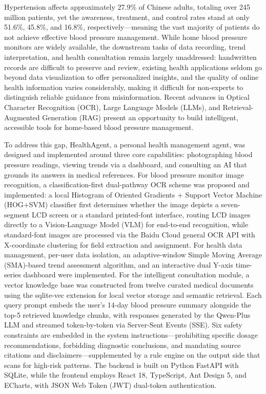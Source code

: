 \documentclass[zihao=-4,a4paper]{ctexart}
\begin{document}
{
Hypertension affects approximately 27.9\% of Chinese adults, totaling over 245 million patients, yet the awareness, treatment, and control rates stand at only 51.6\%, 45.8\%, and 16.8\%, respectively—meaning the vast majority of patients do not achieve effective blood pressure management. While home blood pressure monitors are widely available, the downstream tasks of data recording, trend interpretation, and health consultation remain largely unaddressed: handwritten records are difficult to preserve and review, existing health applications seldom go beyond data visualization to offer personalized insights, and the quality of online health information varies considerably, making it difficult for non-experts to distinguish reliable guidance from misinformation. Recent advances in Optical Character Recognition (OCR), Large Language Models (LLMs), and Retrieval-Augmented Generation (RAG) present an opportunity to build intelligent, accessible tools for home-based blood pressure management.

To address this gap, HealthAgent, a personal health management agent, was designed and implemented around three core capabilities: photographing blood pressure readings, viewing trends via a dashboard, and consulting an AI that grounds its answers in medical references. For blood pressure monitor image recognition, a classification-first dual-pathway OCR scheme was proposed and implemented: a local Histogram of Oriented Gradients + Support Vector Machine (HOG+SVM) classifier first determines whether the image depicts a seven-segment LCD screen or a standard printed-font interface, routing LCD images directly to a Vision-Language Model (VLM) for end-to-end recognition, while standard-font images are processed via the Baidu Cloud general OCR API with X-coordinate clustering for field extraction and assignment. For health data management, per-user data isolation, an adaptive-window Simple Moving Average (SMA)-based trend assessment algorithm, and an interactive dual Y-axis time-series dashboard were implemented. For the intelligent consultation module, a vector knowledge base was constructed from twelve curated medical documents using the sqlite-vec extension for local vector storage and semantic retrieval. Each query prompt embeds the user's 14-day blood pressure summary alongside the top-5 retrieved knowledge chunks, with responses generated by the Qwen-Plus LLM and streamed token-by-token via Server-Sent Events (SSE). Six safety constraints are embedded in the system instructions—prohibiting specific dosage recommendations, forbidding diagnostic conclusions, and mandating source citations and disclaimers—supplemented by a rule engine on the output side that scans for high-risk patterns. The backend is built on Python FastAPI with SQLite, while the frontend employs React 18, TypeScript, Ant Design 5, and ECharts, with JSON Web Token (JWT) dual-token authentication.

}
\end{document}
